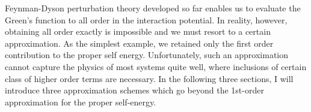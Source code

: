 Feynman-Dyson perturbation theory developed so far enables us to evaluate the Green's function to all order in the interaction potential. In reality, however, obtaining all order exactly is impossible and we must resort to a certain approximation. As the simplest example, we retained only the first order contribution to the proper self energy. Unfortunately, such an approximation cannot capture the physics of most systems quite well, where inclusions of certain class of higher order terms are necessary. In the following three sections, I will introduce three approximation schemes which go beyond the 1st-order approximation for the proper self-energy. 

